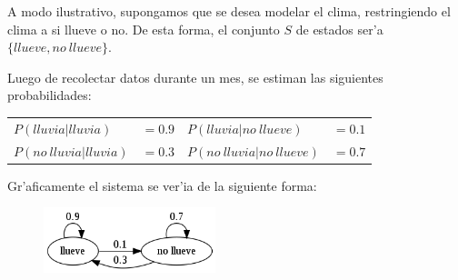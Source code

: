 A modo ilustrativo, supongamos que se desea modelar el clima, restringiendo el clima a si llueve o no. De esta forma, el conjunto $S$ de estados
ser'a $\{llueve, no\ llueve\}$. 

Luego de recolectar datos durante un mes, se estiman las siguientes probabilidades:

\begin{center}
\begin{tabular}{l l l l}
$P(lluvia | lluvia) $ & $=0.9$ & $P(lluvia | no\ llueve) $& $=0.1$\\
$P(no\ lluvia | lluvia)  $ & $=0.3$ & $P(no\ lluvia | no\ llueve) $ & $=0.7$\\
\end{tabular}
\end{center}

Gr'aficamente el sistema se ver'ia de la siguiente forma:

\begin{figure}[h]
\begin{center}
\includegraphics[width=5cm]{images/weather_graph}
\end{center}
\end{figure}


